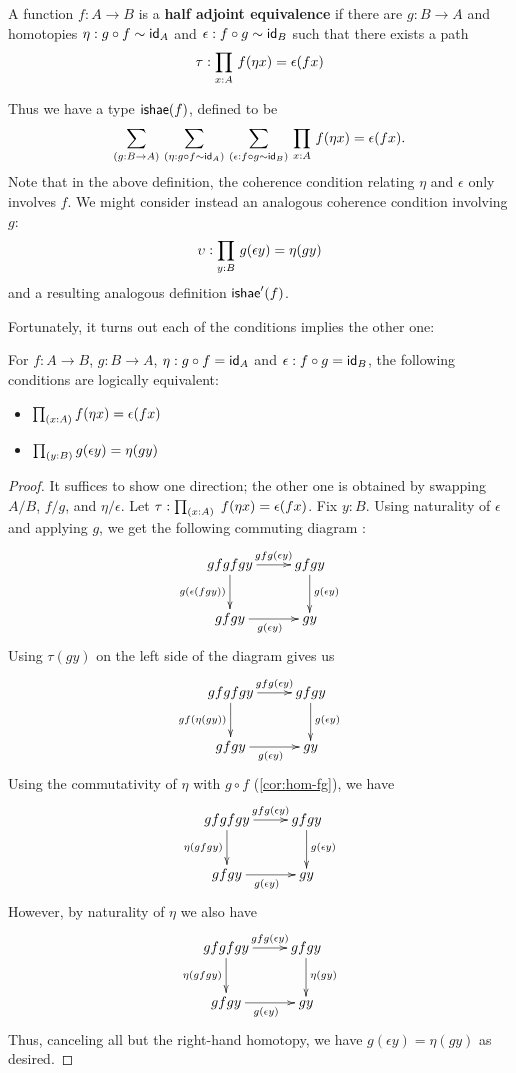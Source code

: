 \begin{defn}\label{defn:ishae}
  A function $f:A\to B$ is a \textbf{half adjoint equivalence} if there are $g:B\to A$ and homotopies $\eta: g \circ f \sim \idfunc[A]$ and $\epsilon:f \circ g \sim \idfunc[B]$ such that there exists a path
  \[\tau : \prd{x:A} \map{f}{\eta x} = \epsilon(fx)\]
\end{defn}

Thus we have a type $\ishae(f)$, defined to be
\begin{equation*}
  \sm{g:B\to A}{\eta: g \circ f \sim \idfunc[A]}{\epsilon:f \circ g \sim \idfunc[B]} \prd{x:A} \map{f}{\eta x} = \epsilon(fx).
\end{equation*}
Note that in the above definition, the coherence condition relating $\eta$ and $\epsilon$ only involves $f$.
We might consider instead an analogous coherence condition involving $g$:
\[\upsilon : \prd{y:B} \map{g}{\epsilon y} = \eta(gy)\]
and a resulting analogous definition $\ishae'(f)$.

Fortunately, it turns out each of the conditions implies the other one:

\begin{lem}\label{lem:coh-equiv}
For $f : A \to B$, $g:B\to A$, $\eta: g \circ f = \idfunc[A]$ and $\epsilon:f \circ g = \idfunc[B]$, the following conditions are logically equivalent:
\begin{itemize}
\item $\prd{x:A} \map{f}{\eta x} = \epsilon(fx)$
\item $\prd{y:B} \map{g}{\epsilon y} = \eta(gy)$
\end{itemize}
\end{lem}
\begin{proof}
  It suffices to show one direction; the other one is obtained by swapping $A/B$, $f/g$, and $\eta/\epsilon$.
  Let $\tau : \prd{x:A}\;\map{f}{\eta x} = \epsilon(fx)$.
  Fix $y : B$.
  Using naturality of $\epsilon$ and applying $g$, we get the following commuting diagram :
\[\uppercurveobject{{ }}\lowercurveobject{{ }}\twocellhead{{ }}
  \xymatrix{gfgfgy \ar^-{gfg(\epsilon y)}[r] \ar_{g(\epsilon (fgy))}[d] & gfgy \ar^{g(\epsilon y)}[d] \\ gfgy \ar_{g(\epsilon y)}[r] & gy
  }\]
Using $\tau(gy)$ on the left side of the diagram gives us
\[\uppercurveobject{{ }}\lowercurveobject{{ }}\twocellhead{{ }}
  \xymatrix{gfgfgy \ar^-{gfg(\epsilon y)}[r] \ar_{gf(\eta (gy))}[d] & gfgy \ar^{g(\epsilon y)}[d] \\ gfgy \ar_{g(\epsilon y)}[r] & gy
  }\]
Using the commutativity of $\eta$ with $g \circ f$ (\autoref{cor:hom-fg}), we have
\[\uppercurveobject{{ }}\lowercurveobject{{ }}\twocellhead{{ }}
  \xymatrix{gfgfgy \ar^-{gfg(\epsilon y)}[r] \ar_{\eta (gfgy)}[d] & gfgy \ar^{g(\epsilon y)}[d] \\ gfgy \ar_{g(\epsilon y)}[r] & gy
  }\]
However, by naturality of $\eta$ we also have
\[\uppercurveobject{{ }}\lowercurveobject{{ }}\twocellhead{{ }}
  \xymatrix{gfgfgy \ar^-{gfg(\epsilon y)}[r] \ar_{\eta (gfgy)}[d] & gfgy \ar^{\eta(gy)}[d] \\ gfgy \ar_{g(\epsilon y)}[r] & gy 
  }\]
Thus, canceling all but the right-hand homotopy, we have $g(\epsilon y) = \eta(g y)$ as desired.
\end{proof}

